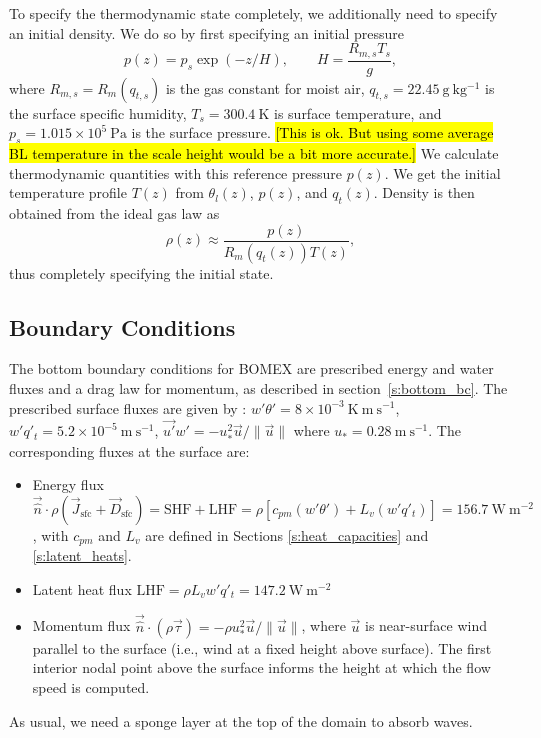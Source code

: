 \documentclass{report}
\begin{document}
To specify the thermodynamic state completely, we additionally need to specify an initial density. We do so by first specifying an initial pressure
\[
p(z) = p_{s} \exp(-z/H), \qquad H = \frac{R_{m,s} T_{s}}{g},
\]
where $R_{m,s} = R_m(q_{t,s})$ is the gas constant for moist air, $q_{t,s} = 22.45~\mathrm{g~kg^{-1}}$ is the surface specific humidity, $T_{s} = 300.4~\mathrm{K}$ is surface temperature, and $p_s = 1.015\times 10^{5}~\mathrm{Pa}$ is the surface pressure. \hl{[This is ok. But using some average BL temperature in the scale height would be a bit more accurate.]} We calculate thermodynamic quantities with this reference pressure $p(z)$. We get the initial temperature profile $T(z)$ from $\theta_l(z)$, $p(z)$, and $q_t(z)$. Density is then obtained from the ideal gas law as
\[
\rho(z) \approx \frac{p(z)}{R_m(q_t(z)) T(z)},
\]
thus completely specifying the initial state. 

\subsection{Boundary Conditions}

The bottom boundary conditions for BOMEX are prescribed energy and water fluxes and a drag law for momentum, as described in section~\ref{s:bottom_bc}. The prescribed surface fluxes are given by \cite{Siebesma2003}: $w'\theta'=8\times10^{-3}~\mathrm{K~m~s^{-1}}$, $w'q'_t=5.2\times10^{-5}~\mathrm{m~s^{-1}}$, $\vec{u'}w'=-u^2_*\vec{u}/\|\vec{u}\|$ where $u_{*}=0.28~\mathrm{m ~s^{-1}}$. The corresponding fluxes at the surface are:
\begin{itemize} 
\item Energy flux $\vec{\hat n} \cdot \rho (\vec{J}_{\mathrm{sfc}} + \vec{D}_{\mathrm{sfc}}) = \mathrm{SHF}+\mathrm{LHF} = \rho[c_{pm}(w'\theta') + L_v (w'q'_t)] = 156.7~\mathrm{W~m^{-2}}$, with $c_{pm}$ and $L_v$ are defined in Sections \ref{s:heat_capacities} and \ref{s:latent_heats}.
\item Latent heat flux $\mathrm{LHF} = \rho L_v w'q'_t=147.2~\mathrm{W~m^{-2}}$
\item Momentum flux $\vec{\hat n} \cdot (\rho \vec{\tau})  = - \rho u^2_*\vec{u}/\|\vec{u}\|$, where $\vec{u}$ is near-surface wind parallel to the surface (i.e., wind at a fixed height above surface). The first interior nodal point above the surface informs the height at which the flow speed is computed.
\end{itemize}
As usual, we need a sponge layer at the top of the domain to absorb waves. 
\end{document}
